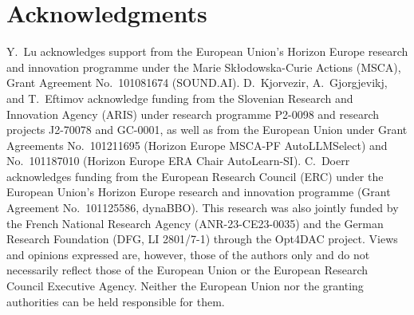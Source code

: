 \section*{Acknowledgments}
\begingroup\footnotesize
Y.~Lu acknowledges support from the European Union's Horizon Europe research and innovation programme under the Marie Sk\l odowska-Curie Actions (MSCA), Grant Agreement No.~101081674 (SOUND.AI). D.~Kjorvezir, A.~Gjorgjevikj, and T.~Eftimov acknowledge funding from the Slovenian Research and Innovation Agency (ARIS) under research programme P2-0098 and research projects J2-70078 and GC-0001, as well as from the European Union under Grant Agreements No.~101211695 (Horizon Europe MSCA-PF AutoLLMSelect) and No.~101187010 (Horizon Europe ERA Chair AutoLearn-SI). C.~Doerr acknowledges funding from the European Research Council (ERC) under the European Union's Horizon Europe research and innovation programme (Grant Agreement No.~101125586, dynaBBO). This research was also jointly funded by the French National Research Agency (ANR-23-CE23-0035) and the German Research Foundation (DFG, LI 2801/7-1) through the Opt4DAC project. Views and opinions expressed are, however, those of the authors only and do not necessarily reflect those of the European Union or the European Research Council Executive Agency. Neither the European Union nor the granting authorities can be held responsible for them.
\endgroup
